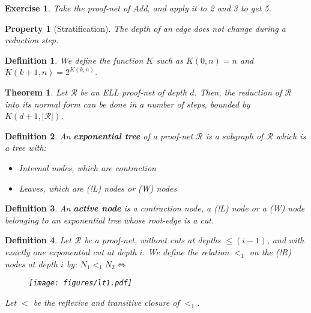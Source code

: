 \documentclass[a4paper,10pt]{article}
\newcommand{\pnet}{\mathcal{R}} %
\newtheorem{definition}{Definition}
\newtheorem{prop}{Property}
\newtheorem{thm}{Theorem}
\newtheorem{exo}{Exercise}
\begin{document}
\begin{exo}
	Take the proof-net of Add, and apply it to 2 and 3 to get 5.
\end{exo}

\begin{prop}[Stratification]
	The depth of an edge does not change during a reduction step.
\end{prop}

\begin{definition}
	We define the function $K$ such as $K(0,n)=n$ and $K(k+1,n) = 2^{K(k,n)}$.
\end{definition}

\begin{thm}
	Let $\pnet$ be an ELL proof-net of depth $d$. Then, the reduction of $\pnet$ into its normal form can be done in a number of steps, bounded by $K(d+1, |\pnet|)$.
\end{thm}

\begin{definition}
	An \textbf{exponential tree} of a proof-net $\pnet$ is a subgraph of $\pnet$ which is a tree with:
		\begin{itemize}
			\item Internal nodes, which are contraction
			\item Leaves, which are (!L) nodes or (W) nodes
		\end{itemize}
\end{definition}

\begin{definition}
	An \textbf{active node} is a contraction node, a (!L) node or a (W) node belonging to an exponential tree whose root-edge is a cut.
\end{definition}

\begin{definition}
 Let $\pnet$ be a proof-net, without cuts at depths $\leq (i-1)$, and with exactly one exponential cut at depth $i$. We define the relation $<_{1}$ on the (!R) nodes at depth $i$ by: $N_1 <_{1} N_2 \Leftrightarrow $

\begin{figure}[h]
	\begin{center}
		\texttt{[image: figures/lt1.pdf]}
	\end{center}	
\end{figure}


 Let $<$ be the reflexive and transitive closure of $<_1$.

\end{definition}
\end{document}
